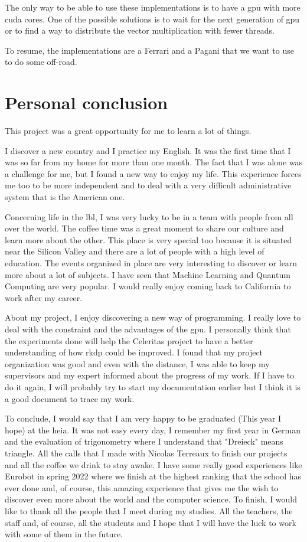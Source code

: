 The only way to be able to use these implementations is to have a \acrshort{gpu}
with more \acrshort{cuda} cores.
One of the possible solutions is to wait for the next generation of \acrshort{gpu} or
to find a way to distribute the vector multiplication with fewer threads.

To resume, the implementations are a Ferrari and a Pagani that we want to use to
do some off-road.

\section{Personal conclusion}
\label{ch:conclusion:personal}

This project was a great opportunity for me to learn a lot of things.

I discover a new country and I practice my English.
It was the first time that I was so far from my home for more than one month.
The fact that I was alone was a challenge for me, but I found a new way to enjoy
my life.
This experience forces me too to be more independent and to deal with a very
difficult administrative system that is the American one.

Concerning life in the \acrshort{lbl}, I was very lucky to be in a team with
people from all over the world.
The coffee time was a great moment to share our culture and learn more about
the other.
This place is very special too because it is situated near the Silicon Valley
and there are a lot of people with a high level of education.
The events organized in place are very interesting to discover or learn more
about a lot of subjects.
I have seen that Machine Learning and Quantum Computing are very
popular.
I would really enjoy coming back to California to work after my career.

About my project, I enjoy discovering a new way of programming.
I really love to deal with the constraint and the advantages of the \acrshort{gpu}.
I personally think that the experiments done will help the Celeritas project to
have a better understanding of how \acrshort{rkdp} could be improved.
I found that my project organization was good and even with the distance, I was
able to keep my supervisors and my expert informed about the progress of my work.
If I have to do it again, I will probably try to start my documentation earlier
but I think it is a good document to trace my work.

To conclude, I would say that I am very happy to be graduated (This year I hope)
at the \acrshort{heia}.
It was not easy every day, I remember my first year in German and the evaluation
of trigonometry where I understand that "Dreieck" means triangle.
All the calls that I made with Nicolas Terreaux to finish our projects and all
the coffee we drink to stay awake.
I have some really good experiences like Eurobot in spring 2022 where we finish
at the highest ranking that the school has ever done and, of course, this
amazing experience that gives me the wish to discover even more about the world and
the computer science.
To finish, I would like to thank all the people that I meet during my studies.
All the teachers, the staff and, of course, all the students and I hope that I
will have the luck to work with some of them in the future.
